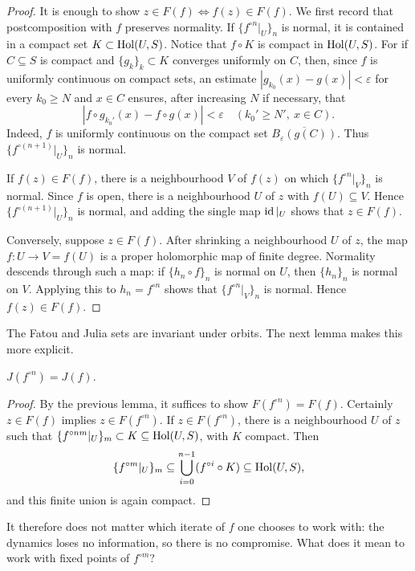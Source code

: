 \documentclass[11pt,a4paper]{article}
\begin{document}
\begin{proof}
It is enough to show $z\in F(f)\Longleftrightarrow f(z)\in F(f)$. We first record that postcomposition with $f$ preserves normality. If $\{f^{\circ n}|_U\}_n$ is normal, it is contained in a compact set $K\subset\operatorname{Hol}(U,S)$.
Notice that $f\circ K$ is compact in $\operatorname{Hol}(U,S)$. For if $C\subseteq S$ is compact and $\{g_k\}_k\subset K$ converges uniformly on $C$, then, since $f$ is uniformly continuous on compact sets, an estimate $|g_{k_0}(x)-g(x)|<\varepsilon$ for every $k_0\ge N$ and $x\in C$ ensures, after increasing $N$ if necessary, that
\[
|f\circ g_{k_0'}(x)-f\circ g(x)|<\varepsilon
\quad(k_0'\ge N',\ x\in C).
\]
Indeed, $f$ is uniformly continuous on the compact set $\overline{B_\varepsilon(g(C))}$. Thus $\{f^{\circ(n+1)}|_U\}_n$ is normal.

If $f(z)\in F(f)$, there is a neighbourhood $V$ of $f(z)$ on which $\{f^{\circ n}|_V\}_n$ is normal. Since $f$ is open, there is a neighbourhood $U$ of $z$ with $f(U)\subseteq V$. Hence $\{f^{\circ(n+1)}|_U\}_n$ is normal, and adding the single map $\operatorname{id}|_U$ shows that $z\in F(f)$.

Conversely, suppose $z\in F(f)$. After shrinking a neighbourhood $U$ of $z$, the map $f\colon U\to V=f(U)$ is a proper holomorphic map of finite degree. Normality descends through such a map: if $\{h_n\circ f\}_n$ is normal on $U$, then $\{h_n\}_n$ is normal on $V$. Applying this to $h_n=f^{\circ n}$ shows that $\{f^{\circ n}|_V\}_n$ is normal. Hence $f(z)\in F(f)$.
\end{proof}
The Fatou and Julia sets are invariant under orbits. The next lemma makes this more explicit.
\setcounter{theorem}{1}\begin{lemma}\label{cd1:iterate}
$J(f^{\circ n})=J(f)$.
\end{lemma}
\begin{proof}
By the previous lemma, it suffices to show $F(f^{\circ n})=F(f)$. Certainly $z\in F(f)$ implies $z\in F(f^{\circ n})$. If $z\in F(f^{\circ n})$, there is a neighbourhood $U$ of $z$ such that $\{f^{\circ nm}|_U\}_m\subset K\subseteq\operatorname{Hol}(U,S)$, with $K$ compact. Then
\[
\{f^{\circ m}|_U\}_m\subseteq\bigcup_{i=0}^{n-1}(f^{\circ i}\circ K)
\subseteq\operatorname{Hol}(U,S),
\]
and this finite union is again compact.
\end{proof}
It therefore does not matter which iterate of $f$ one chooses to work with: the dynamics loses no information, so there is no compromise. What does it mean to work with fixed points of $f^{\circ m}$?
\end{document}
